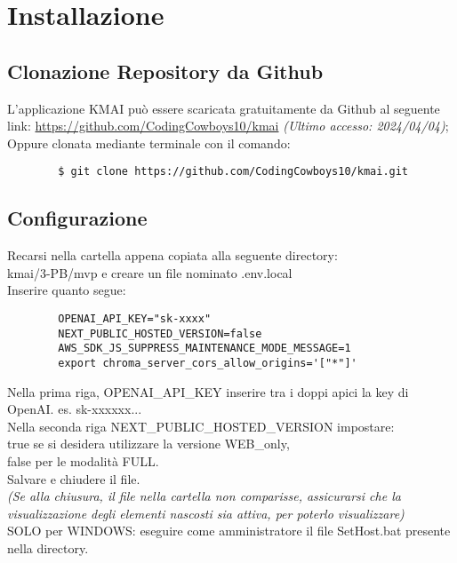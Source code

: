 \chapter{Installazione} \label{cap:Inst}
\section{Clonazione Repository da Github}
L'applicazione KMAI può essere scaricata gratuitamente da Github al seguente link: \url{https://github.com/CodingCowboys10/kmai} \textit{(Ultimo accesso: 2024/04/04)}; \\
Oppure clonata mediante terminale con il comando:
    \begin{lstlisting}
        $ git clone https://github.com/CodingCowboys10/kmai.git
    \end{lstlisting}

\section{Configurazione}
Recarsi nella cartella appena copiata alla seguente directory: \\
kmai/3-PB/mvp e creare un file nominato .env.local\\
Inserire quanto segue:
    \begin{lstlisting}
        OPENAI_API_KEY="sk-xxxx"
        NEXT_PUBLIC_HOSTED_VERSION=false
        AWS_SDK_JS_SUPPRESS_MAINTENANCE_MODE_MESSAGE=1
        export chroma_server_cors_allow_origins='["*"]'
    \end{lstlisting}
Nella prima riga, OPENAI\_API\_KEY inserire tra i doppi apici la key di OpenAI. es. sk-xxxxxx...\\
Nella seconda riga NEXT\_PUBLIC\_HOSTED\_VERSION impostare:\\ true se si desidera utilizzare la versione WEB\_only,\\ false per le modalità FULL.\\
Salvare e chiudere il file.\\
\textit{(Se alla chiusura, il file nella cartella non comparisse, assicurarsi che la visualizzazione degli elementi nascosti sia attiva, per poterlo visualizzare)}\\
SOLO per WINDOWS: eseguire come amministratore il file SetHost.bat presente nella directory.

